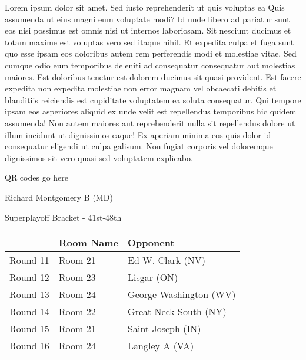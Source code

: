 \documentclass{article}%
\begin{document}
\vspace*{8pt}%
\linebreak%
\newline%
\newline%
    Lorem ipsum dolor sit amet. Sed iusto reprehenderit ut quis voluptas ea Quis assumenda ut eius magni eum voluptate modi? Id unde libero ad pariatur sunt eos nisi possimus est omnis nisi ut internos laboriosam. Sit nesciunt ducimus et totam maxime est voluptas vero sed itaque nihil. Et expedita culpa et fuga sunt quo esse ipsam eos doloribus autem rem perferendis modi et molestiae vitae.\newline%
\newline%
    Sed cumque odio eum temporibus deleniti ad consequatur consequatur aut molestias maiores. Est doloribus tenetur est dolorem ducimus sit quasi provident. Est facere expedita non expedita molestiae non error magnam vel obcaecati debitis et blanditiis reiciendis est cupiditate voluptatem ea soluta consequatur. Qui tempore ipsam eos asperiores aliquid ex unde velit est repellendus temporibus hic quidem assumenda!\newline%
\newline%
    Non autem maiores aut reprehenderit nulla sit repellendus dolore ut illum incidunt ut dignissimos eaque! Ex aperiam minima eos quis dolor id consequatur eligendi ut culpa galisum. Non fugiat corporis vel doloremque dignissimos sit vero quasi sed voluptatem explicabo.\newline%
\newline%
\vspace*{30pt}%
\begin{center}%
\begin{Huge}%
QR codes go here%
\end{Huge}%
\end{center}%
\newpage%
\begin{center}%
\begin{Huge}%
Richard Montgomery B (MD)%
\end{Huge}%
\vspace*{8pt}%
\linebreak%
\begin{Large}%
Superplayoff Bracket {-} 41st{-}48th%
\end{Large}%
\end{center}%
%
\begin{tabularx}{\textwidth}{|c|Y|Y|}%
\hline%
&Room Name&Opponent\\%
\hline%
Round 11&Room 21&Ed W. Clark (NV)\\%
Round 12&Room 23&Lisgar (ON)\\%
Round 13&Room 24&George Washington (WV)\\%
Round 14&Room 22&Great Neck South (NY)\\%
Round 15&Room 21&Saint Joseph (IN)\\%
Round 16&Room 24&Langley A (VA)\\%
\hline%
\end{tabularx}%
\end{document}
